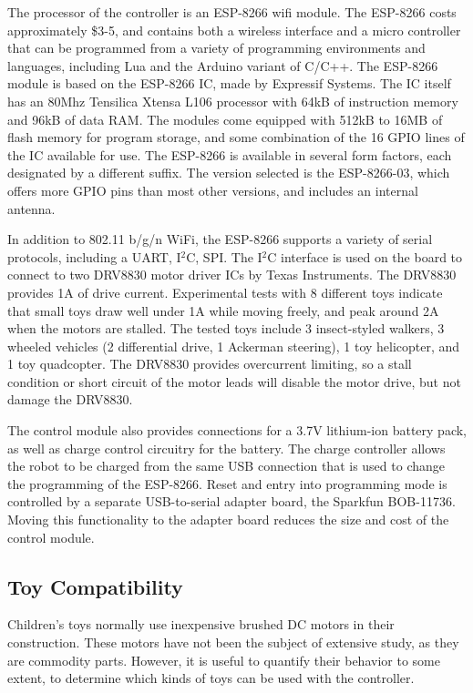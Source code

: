 \documentclass[]{article}
\begin{document}
The processor of the controller is an ESP-8266 wifi module.
The ESP-8266 costs approximately \$3-5, and contains both a wireless interface and a micro controller that can be programmed from a variety of programming environments and languages, including Lua and the Arduino variant of C/C++. The ESP-8266 module is based on the ESP-8266 IC, made by Expressif Systems. The IC itself has an 80Mhz Tensilica Xtensa L106 processor with 64kB of instruction memory and 96kB of data RAM. The modules come equipped with 512kB to 16MB of flash memory for program storage, and some combination of the 16 GPIO lines of the IC available for use. 
The ESP-8266 is available in several form factors, each designated by a different suffix. 
The version selected is the ESP-8266-03, which offers more GPIO pins than most other versions, and includes an internal antenna.

In addition to 802.11 b/g/n WiFi, the ESP-8266 supports a variety of serial protocols, including a UART, I$^2$C, SPI. 
The I$^2$C interface is used on the board to connect to two DRV8830 motor driver ICs by Texas Instruments. 
The DRV8830 provides 1A of drive current.
Experimental tests with 8 different toys indicate that small toys draw well under 1A while moving freely, and peak around 2A when the motors are stalled. 
The tested toys include 3 insect-styled walkers, 3 wheeled vehicles (2 differential drive, 1 Ackerman steering), 1 toy helicopter, and 1 toy quadcopter.
The DRV8830 provides overcurrent limiting, so a stall condition or short circuit of the motor leads will disable the motor drive, but not damage the DRV8830. 

The control module also provides connections for a 3.7V lithium-ion battery pack, as well as charge control circuitry for the battery. 
The charge controller allows the robot to be charged from the same USB connection that is used to change the programming of the ESP-8266. 
Reset and entry into programming mode is controlled by a separate USB-to-serial adapter board, the Sparkfun BOB-11736.
Moving this functionality to the adapter board reduces the size and cost of the control module. 

\subsection{Toy Compatibility}

Children's toys normally use inexpensive brushed DC motors in their construction. 
These motors have not been the subject of extensive study, as they are commodity parts. 
However, it is useful to quantify their behavior to some extent, to determine which kinds of toys can be used with the controller. 
\end{document}
